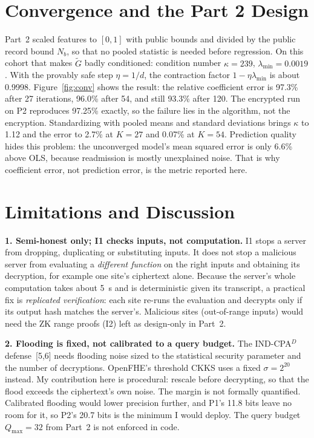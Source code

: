 \documentclass[11pt]{article}
\begin{document}
\section{Convergence and the Part 2 Design}\label{sec:conv}

Part~2 scaled features to $[0,1]$ with public bounds and divided by the public record bound $N_b$, so that no pooled statistic is needed before regression. On this cohort that makes $\tilde G$ badly conditioned: condition number $\kappa=239$, $\lambda_{\min}=0.0019$. With the provably safe step $\eta=1/d$, the contraction factor $1-\eta\lambda_{\min}$ is about 0.9998. Figure~\ref{fig:conv} shows the result: the relative coefficient error is 97.3\% after 27 iterations, 96.0\% after 54, and still 93.3\% after 120. The encrypted run on P2 reproduces 97.25\% exactly, so the failure lies in the algorithm, not the encryption. Standardizing with pooled means and standard deviations brings $\kappa$ to 1.12 and the error to 2.7\% at $K=27$ and 0.07\% at $K=54$. Prediction quality hides this problem: the unconverged model's mean squared error is only 6.6\% above OLS, because readmission is mostly unexplained noise. That is why coefficient error, not prediction error, is the metric reported here.

\section{Limitations and Discussion}\label{sec:lim}

\textbf{1. Semi-honest only; I1 checks inputs, not computation.} I1 stops a server from dropping, duplicating or substituting inputs. It does not stop a malicious server from evaluating a \emph{different function} on the right inputs and obtaining its decryption, for example one site's ciphertext alone. Because the server's whole computation takes about 5~s and is deterministic given its transcript, a practical fix is \emph{replicated verification}: each site re-runs the evaluation and decrypts only if its output hash matches the server's. Malicious sites (out-of-range inputs) would need the ZK range proofs (I2) left as design-only in Part~2.

\textbf{2. Flooding is fixed, not calibrated to a query budget.} The IND-CPA$^D$ defense~[5,6] needs flooding noise sized to the statistical security parameter and the number of decryptions. OpenFHE's threshold CKKS uses a fixed $\sigma=2^{20}$ instead. My contribution here is procedural: rescale before decrypting, so that the flood exceeds the ciphertext's own noise. The margin is not formally quantified. Calibrated flooding would lower precision further, and P1's 11.8 bits leave no room for it, so P2's 20.7 bits is the minimum I would deploy. The query budget $Q_{\max}=32$ from Part~2 is not enforced in code.
\end{document}
